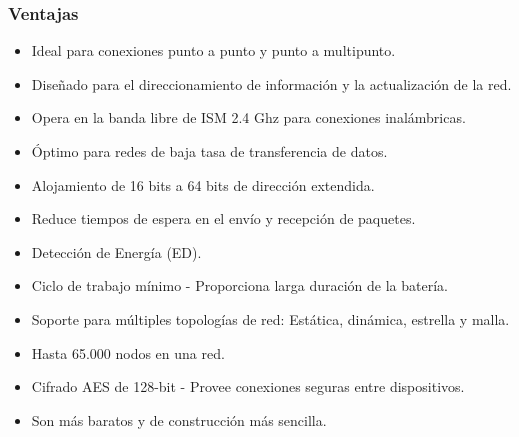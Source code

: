 \subsubsection{Ventajas}
\begin{itemize}
\item Ideal para conexiones punto a punto y punto a multipunto.
\item Diseñado para el direccionamiento de información y la actualización de la red.
\item  Opera en la banda libre de ISM 2.4 Ghz para conexiones inalámbricas.
\item  Óptimo para redes de baja tasa de transferencia de datos.
\item  Alojamiento de 16 bits a 64 bits de dirección extendida.
\item  Reduce tiempos de espera en el envío y recepción de paquetes.
\item  Detección de Energía (ED).
\item  Ciclo de trabajo mínimo - Proporciona larga duración de la batería.
\item  Soporte para múltiples topologías de red: Estática, dinámica, estrella y malla.
\item Hasta 65.000 nodos en una red.
\item  Cifrado AES de 128-bit - Provee conexiones seguras entre dispositivos.
\item Son más baratos y de construcción más sencilla.
\end{itemize}
